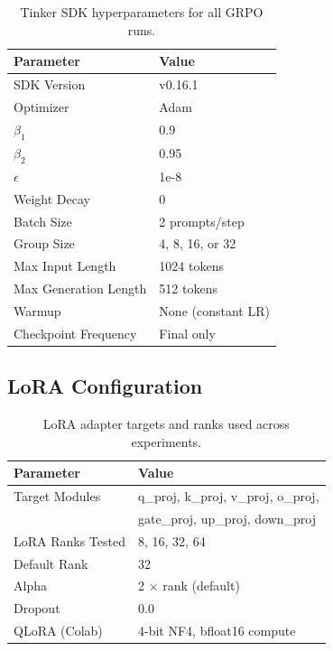 \documentclass{article}
\begin{document}
\begin{table}[htbp]
    \centering
    \caption{Tinker SDK hyperparameters for all GRPO runs.}
    \begin{tabular}{ll}
        \toprule
        Parameter & Value \\
        \midrule
        SDK Version & v0.16.1 \\
        Optimizer & Adam \\
        $\beta_1$ & 0.9 \\
        $\beta_2$ & 0.95 \\
        $\epsilon$ & 1e-8 \\
        Weight Decay & 0 \\
        Batch Size & 2 prompts/step \\
        Group Size & 4, 8, 16, or 32 \\
        Max Input Length & 1024 tokens \\
        Max Generation Length & 512 tokens \\
        Warmup & None (constant LR) \\
        Checkpoint Frequency & Final only \\
        \bottomrule
    \end{tabular}
    \label{tab:tinker_hyperparams}
\end{table}

\subsection{LoRA Configuration}

\begin{table}[htbp]
    \centering
    \caption{LoRA adapter targets and ranks used across experiments.}
    \begin{tabular}{ll}
        \toprule
        Parameter & Value \\
        \midrule
        Target Modules & q\_proj, k\_proj, v\_proj, o\_proj, \\
                        & gate\_proj, up\_proj, down\_proj \\
        LoRA Ranks Tested & 8, 16, 32, 64 \\
        Default Rank & 32 \\
        Alpha & 2 $\times$ rank (default) \\
        Dropout & 0.0 \\
        QLoRA (Colab) & 4-bit NF4, bfloat16 compute \\
        \bottomrule
    \end{tabular}
    \label{tab:lora_config}
\end{table}
\end{document}
